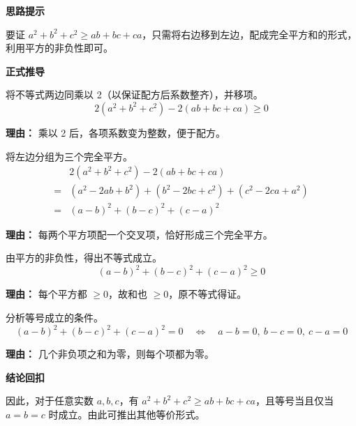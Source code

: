 \begin{proofbox}
\textbf{\textcolor{CProof}{思路提示}}

要证 $a^2+b^2+c^2 \geq ab+bc+ca$，只需将右边移到左边，配成完全平方和的形式，利用平方的非负性即可。

\medskip
\textbf{\textcolor{CProof}{正式推导}}
\begin{description}[style=nextline, leftmargin=2.8em, labelsep=0.5em, itemsep=0.55em]
    \item[\textbf{步骤一（移项与倍乘）：}] 将不等式两边同乘以 2（以保证配方后系数整齐），并移项。
    \[
    2(a^2+b^2+c^2) - 2(ab+bc+ca) \geq 0
    \]
    \par\textbf{理由：}
    乘以 2 后，各项系数变为整数，便于配方。

    \item[\textbf{步骤二（分组配方）：}] 将左边分组为三个完全平方。
    \[
    \begin{aligned}
        &2(a^2+b^2+c^2) - 2(ab+bc+ca) \\
        =& (a^2-2ab+b^2) + (b^2-2bc+c^2) + (c^2-2ca+a^2) \\
        =& (a-b)^2 + (b-c)^2 + (c-a)^2
    \end{aligned}
    \]
    \par\textbf{理由：}
    每两个平方项配一个交叉项，恰好形成三个完全平方。

    \item[\textbf{步骤三（非负性得证）：}] 由平方的非负性，得出不等式成立。
    \[
    (a-b)^2 + (b-c)^2 + (c-a)^2 \geq 0
    \]
    \par\textbf{理由：}
    每个平方都 $\geq 0$，故和也 $\geq 0$，原不等式得证。

    \item[\textbf{步骤四（取等条件）：}] 分析等号成立的条件。
    \[
    (a-b)^2 + (b-c)^2 + (c-a)^2 = 0 \quad \Leftrightarrow \quad a-b=0,\ b-c=0,\ c-a=0
    \]
    \par\textbf{理由：}
    几个非负项之和为零，则每个项都为零。
\end{description}

\medskip
\textbf{\textcolor{CProof}{结论回扣}}

因此，对于任意实数 $a, b, c$，有 $a^2+b^2+c^2 \geq ab+bc+ca$，且等号当且仅当 $a=b=c$ 时成立。由此可推出其他等价形式。
\end{proofbox}
